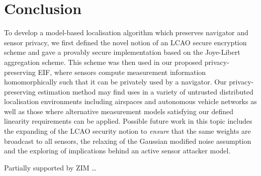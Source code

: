 \documentclass[twocolumn]{autart}
\begin{document}
\section{Conclusion} \label{sec:conclusion}
To develop a model-based localisation algorithm which preserves navigator and sensor privacy, we first defined the novel notion of an LCAO secure encryption scheme and gave a provably secure implementation based on the Joye-Libert aggregation scheme. This scheme was then used in our proposed privacy-preserving EIF, where sensors compute measurement information homomorphically such that it can be privately used by a navigator. Our privacy-preserving estimation method may find uses in a variety of untrusted distributed localisation environments including airspaces and autonomous vehicle networks as well as those where alternative measurement models satisfying our defined linearity requirements can be applied. Possible future work in this topic includes the expanding of the LCAO security notion to \textit{ensure} that the same weights are broadcast to all sensors, the relaxing of the Gaussian modified noise assumption and the exploring of implications behind an active sensor attacker model.

\begin{ack}                               
Partially supported by ZIM \dots
\end{ack}




\appendix
% 
%                                                                                         
%                                                                                         
%                                                                                         
% 
\end{document}
